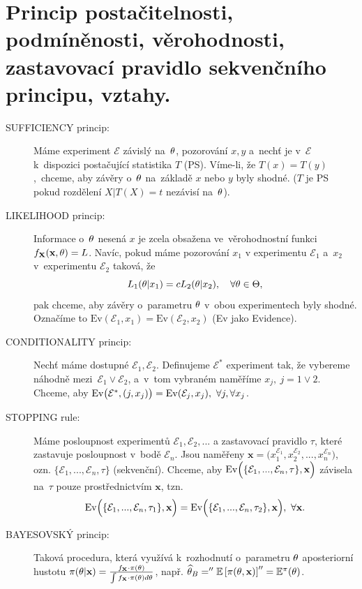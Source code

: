 \chapter{Princip postačitelnosti, podmíněnosti, věrohodnosti, zastavovací pravidlo sekvenčního principu, vztahy.}
\begin{description}
	\item[SUFFICIENCY princip:] Máme experiment $\mathcal{E}$ závislý na~$\theta$, pozorování $x,y$ a~nechť je v~$\mathcal{E}$ k~dispozici postačující statistika $T$ (PS). Víme-li, že $T(x)=T(y)$,~chceme, aby závěry o~$\theta$ na~základě $x$ nebo $y$ byly shodné. ($T$ je PS pokud rozdělení $X|T(X)=t$ nezávisí na~$\theta$).
	
	\item[LIKELIHOOD princip:] Informace o~$\theta$ nesená $x$ je zcela obsažena ve~věrohodnostní funkci $f_{\textbf{X}}(\textbf{x},\theta)=L$. Navíc, pokud máme pozorování $x_1$ v experimentu $\mathcal{E}_1$ a~$x_2$ v~experimentu $\mathcal{E}_2$ taková, že 
	$$ L_1(\theta|x_1)=c L_2(\theta|x_2),\quad\forall\theta\in\Theta,$$
	pak chceme, aby závěry o~parametru $\theta$ v~obou experimentech byly shodné. Označíme to $\mathrm{Ev}(\mathcal{E}_1,x_1)=\mathrm{Ev}(\mathcal{E}_2,x_2)$ (Ev jako Evidence). 
	\item[CONDITIONALITY princip:] Nechť máme dostupné $\mathcal{E}_1,\mathcal{E}_2$. Definujeme $\mathcal{E}^*$ experiment tak, že vybereme náhodně mezi~$\mathcal{E}_1 \vee \mathcal{E}_2$, a~v~tom vybraném naměříme $x_j,~j=1\vee 2$. Chceme, aby $\mathrm{Ev}\big(\mathcal{E}^*,(j,x_j)\big)=\mathrm{Ev}(\mathcal{E}_j,x_j),~\forall j,\forall x_j$.
	\item[STOPPING rule:] Máme posloupnost experimentů $\mathcal{E}_1,\mathcal{E}_2,...$ a zastavovací pravidlo $\tau$, které zastavuje posloupnost v~bodě $\mathcal{E}_n$. Jsou naměřeny $\textbf{x}=\Big( x_1^{\mathcal{E}_1},x_2^{\mathcal{E}_2},...,x_n^{\mathcal{E}_n} \Big)$, ozn. $\{ \mathcal{E}_1,...,\mathcal{E}_n,\tau \}$ (sekvenční). Chceme, aby $\mathrm{Ev}\Big( \{ \mathcal{E}_1,...,\mathcal{E}_n,\tau \},\textbf{x} \Big)$ závisela na~$\tau$ pouze prostřednictvím $\textbf{x}$, tzn. $$\mathrm{Ev}\Big( \{ \mathcal{E}_1,...,\mathcal{E}_n,\tau_1 \},\textbf{x} \Big)=\mathrm{Ev}\Big( \{ \mathcal{E}_1,...,\mathcal{E}_n,\tau_2 \},\textbf{x} \Big),~\forall \textbf{x}.$$
	\item[BAYESOVSKÝ princip:] Taková procedura, která využívá k~rozhodnutí o~parametru $\theta$ aposteriorní hustotu $\pi(\theta|\textbf{x})=\frac{f_{\textbf{X}}\cdot\pi(\theta)}{\int f_{\textbf{X}}\cdot\pi(\theta) d\theta}$, např. $\widehat{\theta}_B=''\mathbb{E}\left[ \pi(\theta,\textbf{x}) \right]''=\mathbb{E}^\pi(\theta)$.
\end{description}

